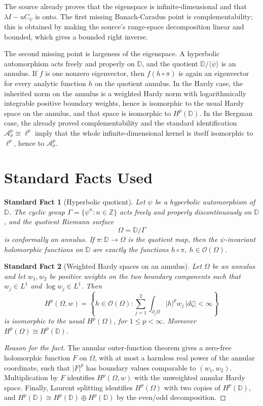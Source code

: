 \documentclass[11pt]{article}
\newtheorem{fact}{Standard Fact}
\newcommand{\D}{\mathbb D}
\newcommand{\Z}{\mathbb Z}
\newcommand{\A}{\mathcal A}
\begin{document}
The source already proves that the eigenspace is infinite-dimensional and that
\(\lambda I-uC_\psi\) is onto.  The first missing Banach-Caradus point is
complementability; this is obtained by making the source's range-space
decomposition linear and bounded, which gives a bounded right inverse.

The second missing point is largeness of the eigenspace.  A hyperbolic
automorphism acts freely and properly on \(\D\), and the quotient
\(\D/\langle\psi\rangle\) is an annulus.  If \(f\) is one nonzero eigenvector,
then \(f(h\circ\pi)\) is again an eigenvector for every analytic function
\(h\) on the quotient annulus.  In the Hardy case, the inherited norm on the
annulus is a weighted Hardy norm with logarithmically integrable positive
boundary weights, hence is isomorphic to the usual Hardy space on the annulus,
and that space is isomorphic to \(H^p(\D)\).  In the Bergman case, the already
proved complementability and the standard identification
\(\A_\sigma^p\cong\ell^p\) imply that the whole infinite-dimensional kernel is
itself isomorphic to \(\ell^p\), hence to \(\A_\sigma^p\).

\section*{Standard Facts Used}

\begin{fact}[Hyperbolic quotient]
Let \(\psi\) be a hyperbolic automorphism of \(\D\).  The cyclic group
\(\Gamma=\{\psi^n:n\in\Z\}\) acts freely and properly discontinuously on
\(\D\), and the quotient Riemann surface
\[
  \Omega=\D/\Gamma
\]
is conformally an annulus.  If \(\pi:\D\to\Omega\) is the quotient map, then
the \(\psi\)-invariant holomorphic functions on \(\D\) are exactly the
functions \(h\circ\pi\), \(h\in\mathcal O(\Omega)\).
\end{fact}

\begin{fact}[Weighted Hardy spaces on an annulus]
Let \(\Omega\) be an annulus and let \(w_1,w_2\) be positive weights on the two
boundary components such that \(w_j\in L^1\) and \(\log w_j\in L^1\).  Then
\[
 H^p(\Omega,w)=
 \left\{h\in\mathcal O(\Omega):
   \sum_{j=1}^2\int_{\partial_j\Omega}|h|^p w_j\,|d\zeta|<\infty
 \right\}
\]
is isomorphic to the usual \(H^p(\Omega)\), for \(1\le p<\infty\).
Moreover \(H^p(\Omega)\cong H^p(\D)\).
\end{fact}

\begin{proof}[Reason for the fact]
The annular outer-function theorem gives a zero-free holomorphic function
\(F\) on \(\Omega\), with at most a harmless real power of the annular
coordinate, such that \(|F|^p\) has boundary values comparable to
\((w_1,w_2)\).  Multiplication by \(F\) identifies \(H^p(\Omega,w)\) with the
unweighted annular Hardy space.  Finally, Laurent splitting identifies
\(H^p(\Omega)\) with two copies of \(H^p(\D)\), and \(H^p(\D)\cong
H^p(\D)\oplus H^p(\D)\) by the even/odd decomposition.
\end{proof}
\end{document}
